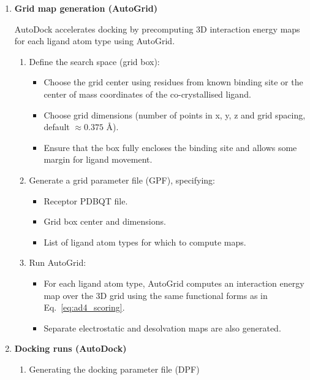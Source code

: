 \documentclass[12pt, a4paper]{article}
\begin{document}
\begin{enumerate}
  \item \textbf{Grid map generation (AutoGrid)}

AutoDock accelerates docking by precomputing 3D interaction energy maps for each ligand atom type using AutoGrid.\cite{CH7_Morris2009}

\begin{enumerate}
  \item Define the search space (grid box):
  \begin{itemize}
    \item Choose the grid center using residues from known binding site or the center of mass coordinates of the co-crystallised ligand.
    \item Choose grid dimensions (number of points in x, y, z and grid spacing, default $ \approx 0.375$ \r{A}).
    \item Ensure that the box fully encloses the binding site and allows some margin for ligand movement.
  \end{itemize}
  \item Generate a grid parameter file (GPF), specifying:
  \begin{itemize}
    \item Receptor PDBQT file.
    \item Grid box center and dimensions.
    \item List of ligand atom types for which to compute maps.
  \end{itemize}
  \item Run AutoGrid:
  \begin{itemize}
    \item For each ligand atom type, AutoGrid computes an interaction energy map over the 3D grid using the same functional forms as in Eq.~\eqref{eq:ad4_scoring}.
    \item Separate electrostatic and desolvation maps are also generated.
  \end{itemize}
\end{enumerate}

  \item \textbf{Docking runs (AutoDock)}
  \begin{enumerate}
\item Generating the docking parameter file (DPF)


\end{enumerate}
\end{enumerate}
\end{document}
